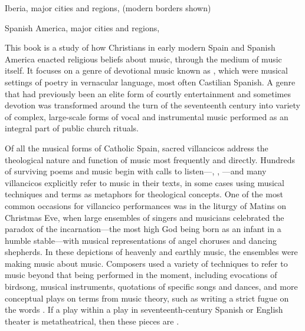 
\begin{map}
    \caption{Iberia, major cities and regions,  (modern borders
    shown)}
    \label{map:iberia}
\end{map}

\begin{map}
    \caption{Spanish America, major cities and regions, }
    \label{map:spanish_america}
\end{map}

This book is a study of how Christians in early modern Spain and Spanish
America enacted religious beliefs about music, through the medium of music
itself.
It focuses on a genre of devotional music known as , which
were musical settings of poetry in vernacular language, most often Castilian
Spanish.
A genre that had previously been an elite form of courtly entertainment and
sometimes devotion was transformed around the turn of the seventeenth century
into variety of complex, large-scale forms of vocal and instrumental music
performed as an integral part of public church rituals.%
    \Autocites
    {Torrente:VC-chapter}
    {Laird:VC}
    {Knighton-Torrente:VCs}
    {Borrego-Marin:Villancico}
    {Illari:Polychoral}
    {CaberoPueyo:PhD}
    {Swadley:VillancicoPhD}
    {ChavezBarcenas:PhD}
    {Castillo:ChantLiturgyReform}

Of all the musical forms of Catholic Spain, sacred villancicos address the
theological nature and function of music most frequently and directly.
Hundreds of surviving poems and music begin with calls to
listen---, , ---and many
villancicos explicitly refer to music in their texts, in some cases using
musical techniques and terms as metaphors for theological concepts.
One of the most common occasions for villancico performances was in the liturgy
of Matins on Christmas Eve, when large ensembles of singers and musicians
celebrated the paradox of the incarnation---the most high God being born
as an infant in a humble stable---with musical representations of
angel choruses and dancing shepherds.
In these depictions of heavenly and earthly music, the ensembles were making
music about music.
Composers used a variety of techniques to refer to music beyond that being
performed in the moment, including evocations of birdsong, musical instruments,
quotations of specific songs and dances, and more conceptual plays on terms
from music theory, such as writing a strict fugue on the words
.
If a play within a play in seventeenth-century Spanish or English theater is
metatheatrical, then these pieces are .

